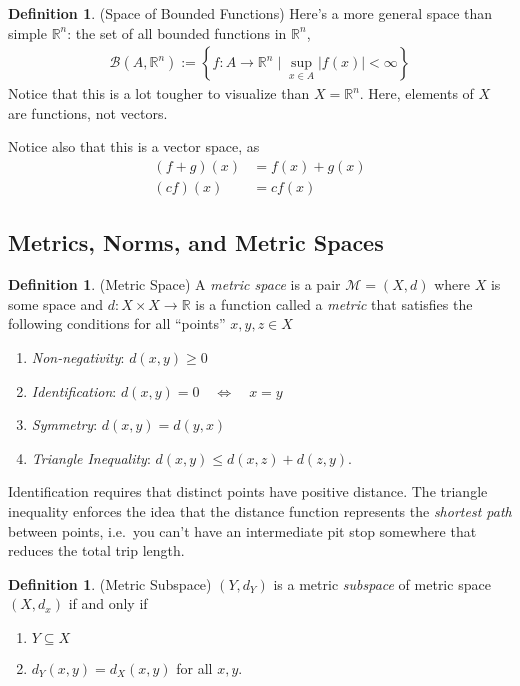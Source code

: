 \documentclass[12pt]{article}
\numberwithin{equation}{section} %
\theoremstyle{plain}
\theoremstyle{definition}
\newtheorem{defn}[thm]{Definition}
\theoremstyle{remark}
\newcommand{\R}{\mathbb{R}}
\begin{document}
\begin{defn}{(Space of Bounded Functions)}
Here's a more general space than simple $\R^n$: the set of all
bounded functions in $\R^n$,
\begin{align*}
  \mathscr{B}(A,\R^n)
  :=
  \left\{
    f:A\rightarrow \R^n \; \big| \; \sup_{x\in A} |f(x)|<\infty
  \right\}
\end{align*}
Notice that this is a lot tougher to visualize than $X=\R^n$.
Here, elements of $X$ are functions, not vectors.

Notice also that this is a vector space, as
\begin{align*}
  (f+g)(x) &= f(x) + g(x)\\
  (cf)(x) &= cf(x)
\end{align*}
\end{defn}



\clearpage
\subsection{Metrics, Norms, and Metric Spaces}

\begin{defn}{(Metric Space)}
\label{defn:metric}
A \emph{metric space} is a pair $\mathscr{M}=(X,d)$ where $X$ is some
space and $d:X\times X\rightarrow \R$ is a function
called a \emph{metric} that satisfies the following conditions for all
``points'' $x,y,z\in X$
\begin{enumerate}
  \item \emph{Non-negativity}: $d(x,y)\geq 0$
  \item \emph{Identification}: $d(x,y) = 0 \quad \Leftrightarrow \quad x=y$
  \item \emph{Symmetry}: $d(x,y)=d(y,x)$
  \item \emph{Triangle Inequality}: $d(x,y) \leq d(x,z) + d(z,y)$.
\end{enumerate}
Identification requires that distinct points have positive distance.
The triangle inequality enforces the idea that the distance function
represents the \emph{shortest path} between points, i.e.\ you can't have
an intermediate pit stop somewhere that reduces the total trip length.
\end{defn}

\begin{defn}{(Metric Subspace)}
$(Y,d_Y)$ is a metric \emph{subspace} of metric space $(X,d_x)$ if and
only if
\begin{enumerate}
  \item $Y\subseteq X$
  \item $d_Y(x,y) = d_X(x,y)$ for all $x,y$.
\end{enumerate}
\end{defn}
\end{document}
